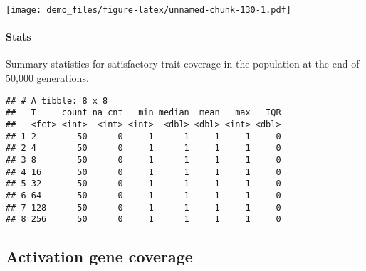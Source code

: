 \documentclass[]{book}
\newenvironment{Shaded}{\begin{snugshade}}{\end{snugshade}}
\newcommand{\DataTypeTok}[1]{\textcolor[rgb]{0.13,0.29,0.53}{#1}}
\newcommand{\KeywordTok}[1]{\textcolor[rgb]{0.13,0.29,0.53}{\textbf{#1}}}
\newcommand{\NormalTok}[1]{#1}
\newcommand{\OperatorTok}[1]{\textcolor[rgb]{0.81,0.36,0.00}{\textbf{#1}}}
\newcommand{\OtherTok}[1]{\textcolor[rgb]{0.56,0.35,0.01}{#1}}
\newcommand{\StringTok}[1]{\textcolor[rgb]{0.31,0.60,0.02}{#1}}
\let\oldparagraph\paragraph
\renewcommand{\paragraph}[1]{\oldparagraph{#1}\mbox{}}
\begin{document}
\texttt{[image: demo\_files/figure-latex/unnamed-chunk-130-1.pdf]}

\hypertarget{stats-24}{%
\paragraph{Stats}\label{stats-24}}

Summary statistics for satisfactory trait coverage in the population at the end of 50,000 generations.

\begin{Shaded}
\end{Shaded}

\begin{verbatim}
## # A tibble: 8 x 8
##   T     count na_cnt   min median  mean   max   IQR
##   <fct> <int>  <int> <int>  <dbl> <dbl> <int> <dbl>
## 1 2        50      0     1      1     1     1     0
## 2 4        50      0     1      1     1     1     0
## 3 8        50      0     1      1     1     1     0
## 4 16       50      0     1      1     1     1     0
## 5 32       50      0     1      1     1     1     0
## 6 64       50      0     1      1     1     1     0
## 7 128      50      0     1      1     1     1     0
## 8 256      50      0     1      1     1     1     0
\end{verbatim}

\hypertarget{activation-gene-coverage-4}{%
\subsection{Activation gene coverage}\label{activation-gene-coverage-4}}
\end{document}
